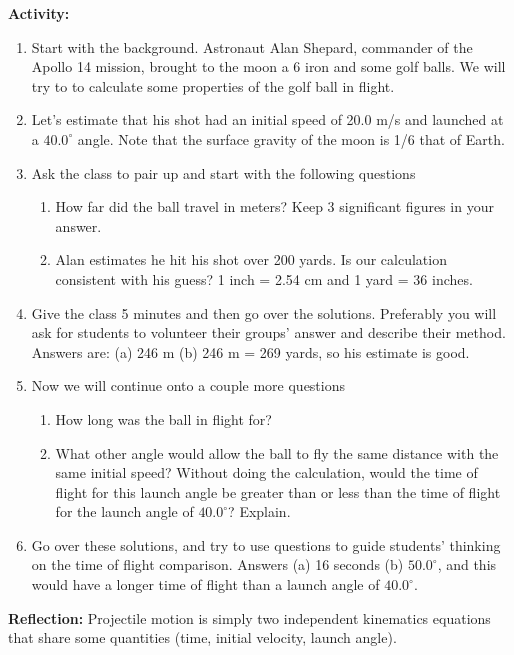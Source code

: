 \documentclass{article}
\begin{document}
\textbf{Activity:}
\begin{enumerate}
\item Start with the background. Astronaut Alan Shepard, commander of the Apollo 14 mission, brought to the moon a 6 iron and some golf balls. We will try to to calculate some properties of the golf ball in flight.

\item Let's estimate that his shot had an initial speed of 20.0 m/s and launched at a $40.0^{\circ}$ angle. Note that the surface gravity of the moon is 1/6 that of Earth.

\item Ask the class to pair up and start with the following questions

\begin{enumerate}
	\item How far did the ball travel in meters? Keep 3 significant figures in your answer.
	\item Alan estimates he hit his shot over 200 yards. Is our calculation consistent with his guess? 1 inch = 2.54 cm and 1 yard = 36 inches.
\end{enumerate}

\item Give the class 5 minutes and then go over the solutions. Preferably you will ask for students to volunteer their groups' answer and describe their method. Answers are: (a) 246 m (b) 246 m = 269 yards, so his estimate is good.

\item Now we will continue onto a couple more questions

\begin{enumerate}
	\item How long was the ball in flight for?
	\item What other angle would allow the ball to fly the same distance with the same initial speed? Without doing the calculation, would the time of flight for this launch angle be greater than or less than the time of flight for the launch angle of $40.0^{\circ}$? Explain.
\end{enumerate}

\item Go over these solutions, and try to use questions to guide students' thinking on the time of flight comparison. Answers (a) 16 seconds (b) $50.0^{\circ}$, and this would have a longer time of flight than a launch angle of $40.0^{\circ}$.
\end{enumerate}

\textbf{Reflection:} Projectile motion is simply two independent kinematics equations that share some quantities (time, initial velocity, launch angle).

\hspace{14pt}
\end{document}
